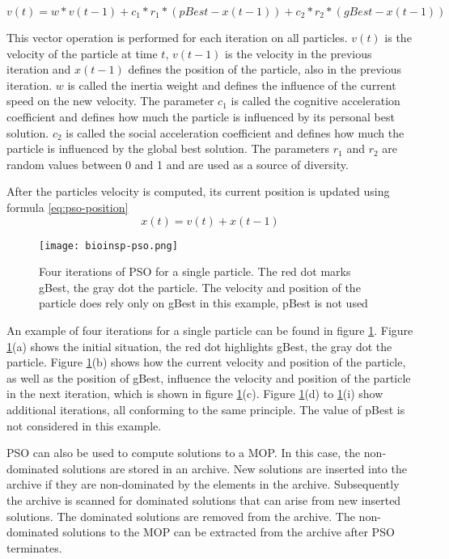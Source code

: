 \begin{equation}\label{eq:pso-speed}
  v(t) = w * v(t - 1) + c_1 * r_1 * (pBest - x(t - 1)) + c_2 * r_2 * (gBest - x(t - 1))
\end{equation}

This vector operation is performed for each iteration on all particles. $v(t)$ is the velocity of the particle at time $t$, $v(t - 1)$ is the velocity in the previous iteration and $x(t - 1)$ defines the position of the particle, also in the previous iteration. $w$ is called the inertia weight and defines the influence of the current speed on the new velocity. The parameter $c_1$ is called the cognitive acceleration coefficient and defines how much the particle is influenced by its personal best solution. $c_2$ is called the social acceleration coefficient and defines how much the particle is influenced by the global best solution. The parameters $r_1$ and $r_2$ are random values between 0 and 1 and are used as a source of diversity.

After the particles velocity is computed, its current position is updated using formula \eqref{eq:pso-position}
\begin{equation}\label{eq:pso-position}
  x(t) = v(t) + x(t - 1)
\end{equation}

\begin{figure}[ht!]
  \centering
  \texttt{[image: bioinsp-pso.png]}
  \caption{Four iterations of PSO for a single particle. The red dot marks gBest, the gray dot the particle. The velocity and position of the particle does rely only on gBest in this example, pBest is not used}
  \label{fig:pso}
\end{figure}

An example of four iterations for a single particle can be found in figure \ref{fig:pso}. Figure \ref{fig:pso}(a) shows the initial situation, the red dot highlights gBest, the gray dot the particle. Figure \ref{fig:pso}(b) shows how the current velocity and position of the particle, as well as the position of gBest, influence the velocity and position of the particle in the next iteration, which is shown in figure \ref{fig:pso}(c). Figure \ref{fig:pso}(d) to \ref{fig:pso}(i) show additional iterations, all conforming to the same principle. The value of pBest is not considered in this example.

PSO can also be used to compute solutions to a MOP. In this case, the non-dominated solutions are stored in an archive. New solutions are inserted into the archive if they are non-dominated by the elements in the archive. Subsequently the archive is scanned for dominated solutions that can arise from new inserted solutions. The dominated solutions are removed from the archive. The non-dominated solutions to the MOP can be extracted from the archive after PSO terminates.

